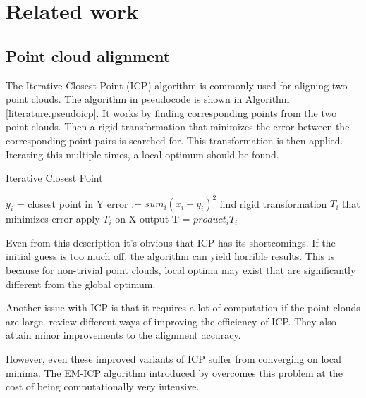 \chapter{Related work}


\section{Point cloud alignment} \label{literature.alignment}


The Iterative Closest Point (ICP) algorithm is commonly used for aligning two point clouds.  The algorithm in pseudocode is shown in Algorithm \ref{literature.pseudoicp}. It works by finding corresponding points from the two point clouds. Then a rigid transformation that minimizes the error between the corresponding point pairs is searched for. This transformation is then applied. Iterating this multiple times, a local optimum should be found.

\begin{algorithm}
\caption{Iterative Closest Point}
\label{literature.pseudoicp}
\begin{algorithmic}
            \State $y_i$ = closest point in Y
        \EndFor
        \State error := $sum_i (x_i-y_i)^2$
        \State find rigid transformation $T_i$ that minimizes error
        \State apply $T_i$ on X
    \EndFor
    \State \Return output T = $product_i T_i$
\end{algorithmic}
\end{algorithm}

Even from this description it's obvious that ICP has its shortcomings. If the initial guess is too much off, the algorithm can yield horrible results. This is because for non-trivial point clouds, local optima may exist that are significantly different from the global optimum.

Another issue with ICP is that it requires a lot of computation if the point clouds are large. \citet{rusinkiewicz2001efficient} review different ways of improving the efficiency of ICP. They also attain minor improvements to the alignment accuracy.

However, even these improved variants of ICP suffer from converging on local minima. The EM-ICP  algorithm introduced by \citet{granger2006multi} overcomes this problem at the cost of being computationally very intensive. 

